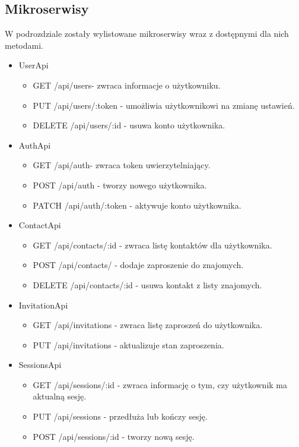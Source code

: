 \documentclass{article}
\begin{document}
  \subsection{Mikroserwisy}
  W podrozdziale zostały wylistowane mikroserwisy wraz z dostępnymi dla nich metodami.
  \begin{itemize}
    \item UserApi
    \begin{itemize}
      \item GET /api/users- zwraca informacje o użytkowniku.
      \item PUT /api/users/:token - umożliwia użytkownikowi na zmianę ustawień.
      \item DELETE /api/users/:id - usuwa konto użytkownika.
    \end{itemize}

    \item AuthApi
    \begin{itemize}
      \item GET /api/auth- zwraca token uwierzytelniający.
      \item POST /api/auth - tworzy nowego użytkownika.
      \item PATCH /api/auth/:token - aktywuje konto użytkownika.
    \end{itemize}

    \item ContactApi
    \begin{itemize}
      \item GET /api/contacts/:id - zwraca listę kontaktów dla użytkownika.
      \item POST /api/contacts/ - dodaje zaproszenie do znajomych.
      \item DELETE /api/contacts/:id - usuwa kontakt z listy znajomych.
    \end{itemize}

    \item InvitationApi
    \begin{itemize}
      \item GET /api/invitations - zwraca listę zaproszeń do użytkownika.
      \item PUT /api/invitations - aktualizuje stan zaproszenia.
    \end{itemize}

    \item SessionsApi
    \begin{itemize}
      \item GET /api/sessions/:id - zwraca informację o tym, czy użytkownik ma aktualną sesję.
      \item PUT /api/sessions - przedłuża lub kończy sesję.
      \item POST /api/sessions/:id - tworzy nową sesję.
    \end{itemize}


\end{itemize}
\end{document}
